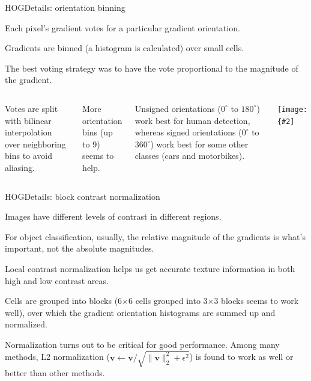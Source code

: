 \documentclass[aspectratio=169]{beamer}
\renewcommand{\vec}[1]{\boldsymbol{#1}}
\newcommand{\myfig}[3]{\centerline{\texttt{[image: \{\#2]}}}
\begin{document}
\begin{frame}{HOG}{Details: orientation binning}

  Each pixel's gradient \alert{votes} for a particular gradient orientation.

  \medskip

  Gradients are binned (a histogram is calculated) over small \alert{cells}.

  \medskip

  The best voting strategy was to have the vote proportional to the
  magnitude of the gradient.

  \begin{columns}

    \column{3in}

  Votes are split with bilinear interpolation over neighboring bins to
  avoid aliasing.

  \medskip

  More orientation bins (up to 9) seems to help.

  \alert{Unsigned orientations} ($0^\circ$ to $180^\circ$) work best
  for human detection, whereas \alert{signed orientations} ($0^\circ$
  to $360^\circ$) work best for some other classes (cars and motorbikes).

  \column{1.5in}

    \myfig{1in}{dalal-hist}{}

  \end{columns}
  
\end{frame}


\begin{frame}{HOG}{Details: block contrast normalization}

  Images have different levels of contrast in different regions.

  \medskip

  For object classification, usually, the \alert{relative} magnitude
  of the gradients is what's important, not the absolute magnitudes.

  \medskip

  \alert{Local contrast normalization} helps us get accurate texture
  information in both high and low contrast areas.

  \medskip

  Cells are grouped into \alert{blocks} (6$\times$6 cells grouped into
  3$\times$3 blocks seems to work well), over which the gradient
  orientation histograms are summed up and normalized.

  \medskip

  Normalization turns out to be critical for good performance. Among
  many methods, L2 normalization ($\vec{v} \leftarrow \vec{v} /
  \sqrt{\|\vec{v}\|^2_2 + \epsilon^2}$) is found to work as well or better
  than other methods.

\end{frame}
\end{document}
